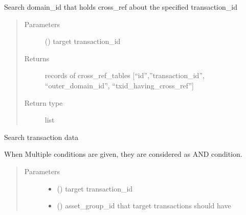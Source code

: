 \documentclass[letterpaper,10pt,english]{sphinxmanual}
\begin{document}
\begin{fulllineitems}

\begin{fulllineitems}
\label{\detokenize{bbc1.core.data_handler:bbc1.core.data_handler.DataHandler.search_domain_having_cross_ref}}
Search domain\_id that holds cross\_ref about the specified transaction\_id
\begin{quote}\begin{description}
\item[{Parameters}] \leavevmode
{} () \textendash{} target transaction\_id

\item[{Returns}] \leavevmode
records of cross\_ref\_tables {[}“id”,”transaction\_id”, “outer\_domain\_id”, “txid\_having\_cross\_ref”{]}

\item[{Return type}] \leavevmode
list

\end{description}\end{quote}

\end{fulllineitems}


\begin{fulllineitems}
\label{\detokenize{bbc1.core.data_handler:bbc1.core.data_handler.DataHandler.search_transaction}}
Search transaction data

When Multiple conditions are given, they are considered as AND condition.
\begin{quote}\begin{description}
\item[{Parameters}] \leavevmode\begin{itemize}
\item {} 
 () \textendash{} target transaction\_id

\item {} 
 () \textendash{} asset\_group\_id that target transactions should have


\end{itemize}
\end{description}
\end{quote}
\end{fulllineitems}
\end{fulllineitems}
\end{document}
